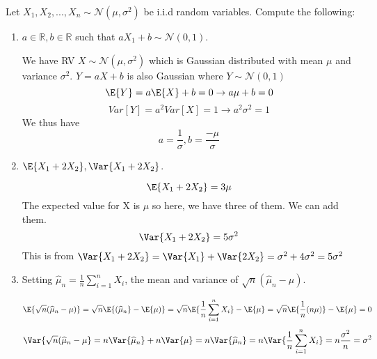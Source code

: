 \documentclass{article}
\begin{document}
\noindent\makebox[\linewidth]{\rule{\textwidth}{0.4pt}}
\begin{aprob}
    Let $X_1, X_2, ..., X_n \sim \mathcal{N}(\mu, \sigma^2)$ be i.i.d random variables. Compute the following:
    \begin{enumerate}
        \item {} $a\in{\mathbb R},b\in{\mathbb R}$ such that $aX_1+b \sim \mathcal{N}(0,1)$.
        
        We have RV $ X \sim \mathcal{N}(\mu, \sigma^2)$ which is Gaussian distributed with mean $\mu$ and variance $\sigma^2$. $Y = aX + b$ is also Gaussian where $Y \sim \mathcal{N}(0,1)$
        \begin{equation}
        \E{Y} = a\E{X} + b = 0 \rightarrow a\mu + b = 0 
        \end{equation}
        \begin{equation}
        Var[Y] = a^2 Var[X] = 1
        \rightarrow a^2 \sigma^2 = 1 
        \end{equation}
        We thus have 
        $$ a = \frac{1}{\sigma}, b = \frac{-\mu}{\sigma}$$

        \item {} $\E{X_1 + 2X_2}, \Var{X_1 + 2X_2}$.
        
        $$\E{X_1 + 2X_2} = 3\mu$$
        The expected value for X is $\mu$ so here, we have three of them. We can add them.
        $$ \Var{X_1 + 2X_2} = 5\sigma^2 $$
        This is from $\Var{X_1 + 2X_2} = \Var{X_1} + \Var{2X_2} = \sigma^2 + 4\sigma^2 = 5\sigma^2$
        
        \item {} Setting $\widehat{\mu}_n = \frac{1}{n} \sum_{i=1}^n X_i$, the mean and variance of $\sqrt{n}(\widehat{\mu}_n - \mu)$.
        
        \begin{equation}
        \E{\sqrt{n}(\widehat{\mu}_n - \mu)} = \sqrt{n} \E{(\widehat{\mu}_n} - \E{\mu)} = \sqrt{n} \E{\frac{1}{n} \sum_{i=1}^n X_i} - \E{\mu} = \sqrt{n} \E{\frac{1}{n}(n\mu)}-\E{\mu} = 0
        \end{equation}
        \begin{equation}
        \Var{\sqrt{n}(\widehat{\mu}_n - \mu} = n\Var{\widehat{\mu}_n} + n\Var{\mu} = n\Var{\widehat{\mu}_n} = n\Var{\frac{1}{n} \sum_{i=1}^n X_i} = n \frac{\sigma^2}{n} = \sigma^2
        \end{equation}
        
    \end{enumerate}

\end{aprob}
\noindent\makebox[\linewidth]{\rule{\textwidth}{0.4pt}}
\end{document}
